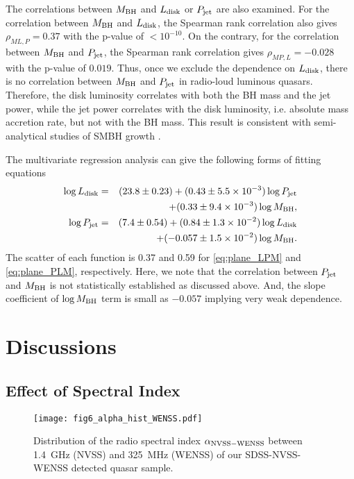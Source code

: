 \documentclass[preprint2,twocolappendix]{aastex6}
\begin{document}
The correlations between $M_{\rm BH}$ and $L_{\rm disk}$ or $P_{\rm jet}$ are also examined. For the correlation between $M_{\rm BH}$ and $L_{\rm disk}$, the Spearman rank correlation also gives $\rho_{ML, P}=0.37$ with the p-value of $<10^{-10}$. On the contrary, for the correlation between $M_{\rm BH}$ and $P_{\rm jet}$, the Spearman rank correlation gives $\rho_{MP, L}=-0.028$ with the p-value of $0.019$. Thus, once we exclude the dependence on $L_{\rm disk}$, there is no correlation between $M_{\rm BH}$ and $P_{\rm jet}$ in radio-loud luminous quasars. Therefore, the disk luminosity correlates with both the BH mass and the jet power, while the jet power correlates with the disk luminosity, i.e. absolute mass accretion rate, but not with the BH mass. This result is consistent with semi-analytical studies of SMBH growth \citep{mer08}.


The multivariate regression analysis can give the following forms of fitting equations
\begin{eqnarray}
\log L_{\rm disk} &=& (23.8\pm0.23) + (0.43\pm5.5\times10^{-3}) \log P_{\rm jet} \nonumber \\
&&+ (0.33\pm9.4\times10^{-3}) \log M_{\rm BH}, \label{eq:plane_LPM}\\
\log P_{\rm jet} &=& (7.4\pm0.54) + (0.84\pm1.3\times10^{-2}) \log L_{\rm disk} \nonumber \\
&&+ (-0.057\pm1.5\times10^{-2}) \log M_{\rm BH}. \label{eq:plane_PLM}
\end{eqnarray}
The scatter of each function is 0.37 and 0.59 for \autoref{eq:plane_LPM} and \autoref{eq:plane_PLM}, respectively. Here, we note that the correlation between $P_{\rm jet}$ and $M_{\rm BH}$ is not statistically established as discussed above. And, the slope coefficient of $\log M_{\rm BH}$ term is small as $-0.057$ implying very weak dependence. 

\section{Discussions}
\label{sec:dis}

\subsection{Effect of Spectral Index}

\begin{figure}[t]
 \begin{center}
  \texttt{[image: fig6\_alpha\_hist\_WENSS.pdf]} 
 \end{center}
\caption{Distribution of the radio spectral index $\alpha_{\rm NVSS-WENSS}$ between 1.4~GHz (NVSS) and 325~MHz (WENSS) of our SDSS-NVSS-WENSS detected quasar sample.}\label{fig:alpha_WENSS}
\end{figure}
\end{document}
